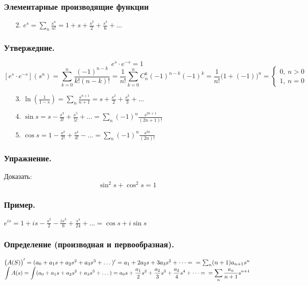 \documentclass[12pt, letterpaper, twoside]{article}
\newcommand{\DS}{\displaystyle}
\begin{document}
    \subsubsection*{Элементарные производящие функции}
    \begin{enumerate}
        \item[2.] $e^s = \DS\sum_{n} \frac{s^n}{n!} = 1 + s + \frac{s^2}{2} + \frac{s^3}{6} + \dots$
    \end{enumerate}
    \subsubsection*{Утвержедние.}
    \[e^s\cdot e^{-s} = 1\]
    \[\left[e^s\cdot e^{-s}\right](s^n) = \sum_{k = 0}^n \frac{(-1)^{n - k} }{k!(n - k)!} = \frac{1}{n!}\sum_{k =0}^n C_n^k (-1)^{n - k}(-1)^k = \frac{1}{n!} \big(1 + (-1)\big)^n = \begin{cases}
        0,\ n > 0\\
        1,\ n = 0
    \end{cases}\]
    \begin{enumerate}
        \item[3.] $\DS\ln(\frac{1}{1 - s}) = \sum_{n} \frac{s^{n + 1} }{n + 1} = s + \frac{s^2}{2} + \frac{s^3}{3} + \dots$
        \item[4.] $\DS \sin s = s - \frac{s^3}{3!} + \frac{s^5}{5!} + \dots = \sum_{n} (-1)^n \frac{s^{2n + 1}}{(2n + 1)!}$
        \item[5.] $\DS \cos s = 1 - \frac{s^2}{2!} + \frac{s^4}{4!} - \dots = \sum_{n} (-1)^n \frac{s^{2n}}{(2n)!}$  
    \end{enumerate}
    \subsubsection*{Упражнение.}
    Доказать:
    \[\sin^2 s + \cos^2 s = 1\]
    \subsubsection*{Пример.}
    $\DS e^{is} = 1 + is - \frac{s^2}{2} - \frac{is^3}{6} + \frac{s^4}{24} + \dots = \cos s + i\sin s$
    \subsubsection*{Определение (производная и первообразная).}
    $\big( A(S) \big)' = (a_0 + a_1 s + a_2 s^2 + a_3 s^3 + \dots)' = a_1 + 2a_2 s + 3a_3 s^2 + \dots =\\
    = \sum_{n} (n + 1)a_{n + 1}s^n$\\
    $\DS \int A(s) = \int (a_0 + a_1 s + a_2 s^2 + a_3 s^3 + \dots) = a_0 s + \frac{a_1}{2}s^2 + \frac{a_2}{3}s^3 + \frac{a_3}{4}s^4 + \dots =\\
    = \sum_{n} \frac{a_n}{n + 1}s^{n + 1}$
\end{document}
